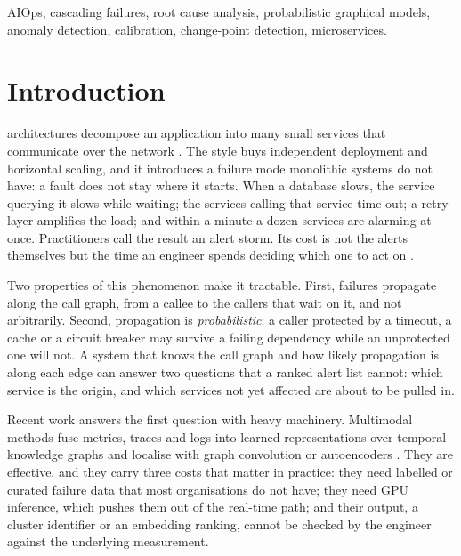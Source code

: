 \documentclass[journal]{IEEEtran}
\begin{document}
\begin{IEEEkeywords}
AIOps, cascading failures, root cause analysis, probabilistic graphical models, anomaly detection, calibration, change-point
detection, microservices.
\end{IEEEkeywords}

\IEEEpeerreviewmaketitle

\section{Introduction}
 architectures decompose an application into many small services that communicate over the
network \cite{dragoni2017microservices}. The style buys independent deployment and horizontal scaling, and it introduces a
failure mode monolithic systems do not have: a fault does not stay where it starts. When a database slows, the service
querying it slows while waiting; the services calling that service time out; a retry layer amplifies the load; and within a
minute a dozen services are alarming at once. Practitioners call the result an alert storm. Its cost is not the alerts
themselves but the time an engineer spends deciding which one to act on \cite{beyer2016sre,notaro2021survey}.

Two properties of this phenomenon make it tractable. First, failures propagate along the call graph, from a callee to the
callers that wait on it, and not arbitrarily. Second, propagation is \emph{probabilistic}: a caller protected by a timeout,
a cache or a circuit breaker may survive a failing dependency while an unprotected one will not. A system that knows the call
graph and how likely propagation is along each edge can answer two questions that a ranked alert list cannot: which service
is the origin, and which services not yet affected are about to be pulled in.

Recent work answers the first question with heavy machinery. Multimodal methods fuse metrics, traces and logs into learned
representations over temporal knowledge graphs and localise with graph convolution or autoencoders
\cite{zhang2023diagfusion,sun2024deephunt,lee2023eadro}. They are effective, and they carry three costs that matter in
practice: they need labelled or curated failure data that most organisations do not have; they need GPU inference, which
pushes them out of the real-time path; and their output, a cluster identifier or an embedding ranking, cannot be checked by
the engineer against the underlying measurement.
\end{document}
